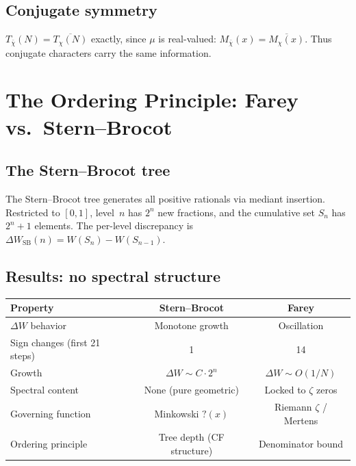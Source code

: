 \documentclass[11pt]{article}
\theoremstyle{definition}
\begin{document}
\subsection{Conjugate symmetry}

$T_{\bar\chi}(N) = \overline{T_\chi(N)}$ exactly, since $\mu$ is
real-valued: $M_{\bar\chi}(x) = \overline{M_\chi(x)}$.  Thus
conjugate characters carry the same information.



\section{The Ordering Principle: Farey vs.\ Stern--Brocot}
\label{sec:ordering}

\subsection{The Stern--Brocot tree}

The Stern--Brocot tree generates all positive rationals via mediant
insertion.  Restricted to $[0,1]$, level~$n$ has $2^n$ new fractions,
and the cumulative set $S_n$ has $2^n + 1$ elements.  The per-level
discrepancy is
$\Delta W_{\mathrm{SB}}(n) = W(S_n) - W(S_{n-1})$.

\subsection{Results: no spectral structure}

\begin{center}
\begin{tabular}{lcc}
\toprule
Property & Stern--Brocot & Farey \\
\midrule
$\Delta W$ behavior & Monotone growth & Oscillation \\
Sign changes (first 21 steps) & 1 & 14 \\
Growth & $\Delta W \sim C \cdot 2^n$ & $\Delta W \sim O(1/N)$ \\
Spectral content & None (pure geometric) & Locked to $\zeta$ zeros \\
Governing function & Minkowski $?(x)$ & Riemann $\zeta$ / Mertens \\
Ordering principle & Tree depth (CF structure) & Denominator bound \\
\bottomrule
\end{tabular}
\end{center}
\end{document}
